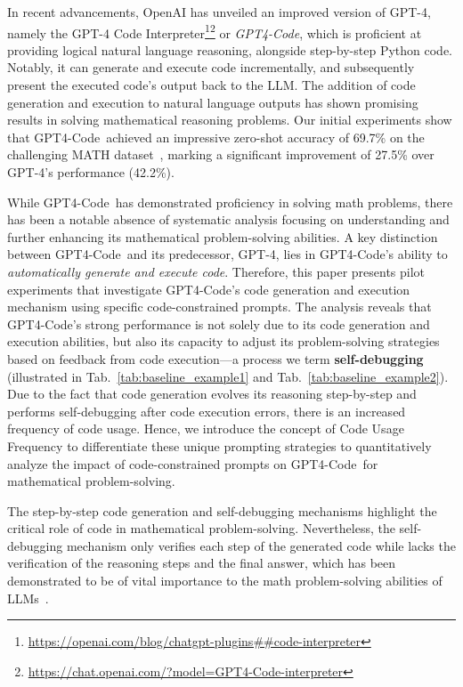 \documentclass{article} \usepackage{iclr2023_conference,times}
\newcommand{\gptcode}{GPT4-Code}
\begin{document}
In recent advancements, OpenAI has unveiled an improved version of GPT-4, namely the GPT-4 Code Interpreter\footnote{\url{https://openai.com/blog/chatgpt-plugins##code-interpreter}}\footnote{\url{https://chat.openai.com/?model=\gptcode-interpreter}} or \textit{\gptcode}, which is proficient at providing logical natural language reasoning, alongside step-by-step Python code. Notably, it can generate and execute code incrementally, and subsequently present the executed code's output back to the LLM. The addition of code generation and execution to natural language outputs has shown promising results in solving mathematical reasoning problems. Our initial experiments show that \gptcode~achieved an impressive
 zero-shot accuracy of 69.7\% on the challenging MATH dataset~\citep{hendrycks2021measuring}, marking a significant improvement of 27.5\% over GPT-4's performance (42.2\%).

While \gptcode~has demonstrated proficiency in solving math problems, there has been a notable absence of systematic analysis focusing on understanding and further enhancing its mathematical problem-solving abilities. A key distinction between \gptcode~and its predecessor, GPT-4, lies in \gptcode 's ability to \textit{automatically generate and execute code}. Therefore,  this paper presents pilot experiments that investigate \gptcode 's code generation and execution mechanism using specific code-constrained prompts. The analysis reveals that \gptcode 's strong performance is not solely due to its code generation and execution abilities, but also its capacity to adjust its problem-solving strategies based on feedback from code execution—a process we term \textbf{self-debugging} (illustrated in Tab.~\ref{tab:baseline_example1} and Tab.~\ref{tab:baseline_example2}). Due to the fact that code generation evolves its reasoning step-by-step and performs self-debugging after code execution errors, there is an increased frequency of code usage. Hence, we introduce the concept of Code Usage Frequency to differentiate these unique prompting strategies to quantitatively analyze the impact of code-constrained prompts on \gptcode~for mathematical problem-solving. 

The step-by-step code generation and self-debugging mechanisms highlight the critical role of code in mathematical problem-solving. Nevertheless, the self-debugging mechanism only verifies each step of the generated code while lacks the verification of the reasoning steps and the final answer, which has been demonstrated to be of vital importance to the math problem-solving abilities of LLMs~\citep{cobbe2021gsm8k, lightman2023lets, weng2023large}. 
\end{document}

